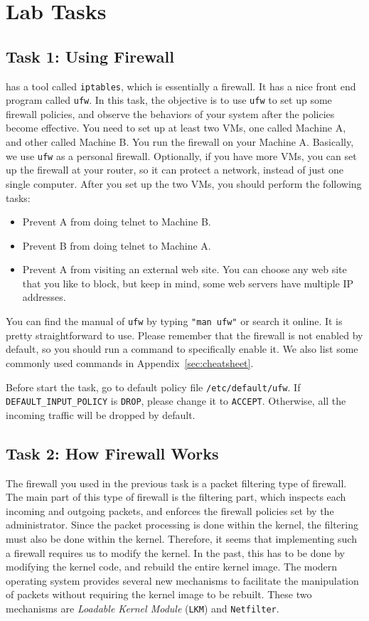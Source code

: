 \section{Lab Tasks}


\subsection{Task 1: Using Firewall}

\linux has a tool called {\tt iptables}, which is essentially a firewall.
It has a nice front end program called {\tt ufw}. In this task, 
the objective is to use {\tt ufw} to set up some firewall policies, and 
observe the behaviors of your system after the policies become effective.
You need to set up at least two VMs, one called Machine A, and other called 
Machine B. You run the firewall on your Machine A. Basically, we use 
{\tt ufw} as a personal firewall. Optionally, if you have more VMs, you can 
set up the firewall at your router, so it can protect a network, instead of 
just one single computer. After you set up the two VMs, you should perform
the following tasks: 
\begin{itemize}
\item Prevent A from doing telnet to Machine B.
\item Prevent B from doing telnet to Machine A.
\item Prevent A from visiting an external web site. You can choose any web
site that you like to block, but keep in mind, some web servers have multiple
IP addresses. 
\end{itemize}


You can find the manual of {\tt ufw} by typing {\tt "man ufw"} or search it
online. It is pretty straightforward to use. Please remember that the
firewall is not enabled by default, so you should run a command to 
specifically enable it. We also list some commonly used commands 
in Appendix~\ref{sec:cheatsheet}. 


Before start the task, go to default policy file {\tt /etc/default/ufw}. If 
{\tt DEFAULT\_INPUT\_POLICY} is {\tt DROP}, please change it to {\tt ACCEPT}.  
Otherwise, all the incoming traffic will be dropped by default.

\subsection{Task 2: How Firewall Works} 

The firewall you used in the previous task is a packet filtering 
type of firewall. The main part of this type of firewall is the filtering part, 
which inspects each incoming and outgoing packets, and enforces the firewall policies 
set by the administrator. Since the packet 
processing is done within the kernel, the filtering must also be 
done within the kernel. Therefore, it seems that implementing such
a firewall requires us to modify the \linux kernel. In the past, 
this has to be done by modifying the kernel
code, and rebuild the entire kernel image. The modern \linux 
operating system provides several new mechanisms 
to facilitate the manipulation of packets without requiring the 
kernel image to be rebuilt. These two mechanisms are 
{\em Loadable Kernel Module} ({\tt LKM}) and {\tt Netfilter}.
 

